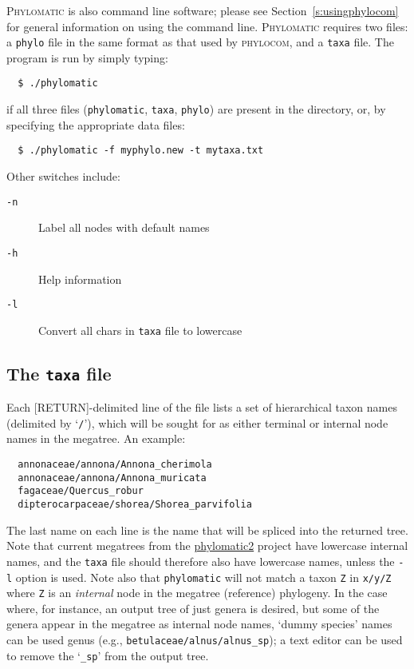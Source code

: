 \documentclass[12pt,letterpaper]{article}
\begin{document}
{\scshape Phylomatic} is also command line software; please see
Section~\ref{s:usingphylocom} for general information on using the
command line.  {\scshape Phylomatic} requires two files: a
\texttt{phylo} file in the same format as that used by {\scshape
  phylocom}, and a \texttt{taxa} file.  The program is run by simply
typing:
\begin{verbatim}
  $ ./phylomatic
\end{verbatim}
if all three files (\texttt{phylomatic}, \texttt{taxa},
\texttt{phylo}) are present in the directory, or, by specifying the
appropriate data files:
\begin{verbatim}
  $ ./phylomatic -f myphylo.new -t mytaxa.txt
\end{verbatim}  
Other switches include:
\begin{description}
  \item[\texttt{-n}] Label all nodes with default names
  \item[\texttt{-h}] Help information
  \item[\texttt{-l}] Convert all chars in \texttt{taxa} file to lowercase
\end{description}

\subsection{The \texttt{taxa} file}

Each [RETURN]-delimited line of the file lists a set of hierarchical
taxon names (delimited by `\texttt{/}'), which will be sought for as
either terminal or internal node names in the megatree.  An example:
\begin{verbatim}
  annonaceae/annona/Annona_cherimola
  annonaceae/annona/Annona_muricata
  fagaceae/Quercus_robur
  dipterocarpaceae/shorea/Shorea_parvifolia
\end{verbatim}
The last name on each line is the name that will be spliced into the
returned tree.  Note that current megatrees from the
\href{http://phylodiversity.net/phylomatic/}{phylomatic2}
project have lowercase internal names, and the \texttt{taxa} file
should therefore also have lowercase names, unless the \texttt{-l}
option is used.  Note also that \texttt{phylomatic} will not match a
taxon \texttt{Z} in \texttt{x/y/Z} where \texttt{Z} is an {\it
  internal} node in the megatree (reference) phylogeny. In the case
where, for instance, an output tree of just genera is desired, but
some of the genera appear in the megatree as internal node names,
`dummy species' names can be used genus (e.g.,
\texttt{betulaceae/alnus/alnus\_sp}); a text editor can be used to
remove the `\texttt{\_sp}' from the output tree.
\end{document}
